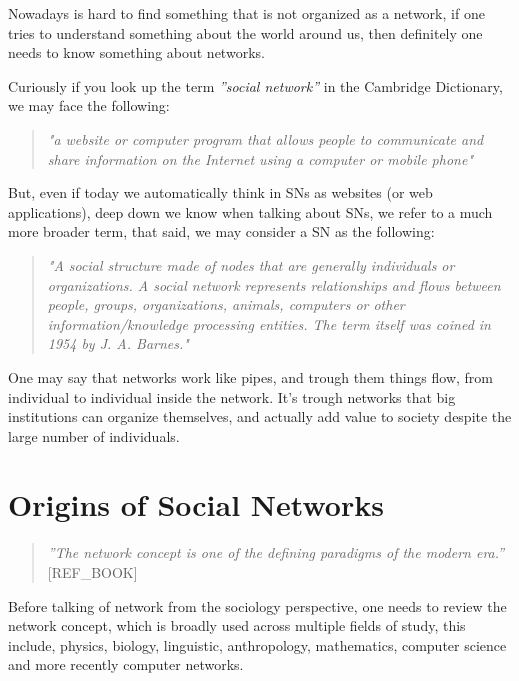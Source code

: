 
\indent \indent Nowadays is hard to find something that is not organized as a network, if one tries to understand something about the world around us, then definitely one needs to know something about networks.

Curiously if you look up the term \textit{''social network''} in the Cambridge Dictionary, we may face the following:

\begin{quote}
\textit{"a website or computer program that allows people to communicate and share information on the Internet using a computer or mobile phone"}
\end{quote}

But, even if today we automatically think in SNs as websites (or web applications), deep down we know when talking about SNs, we refer to a much more broader term, that said, we may consider a SN as the following:

\begin{quote}
\textit{"A social structure made of nodes that are generally individuals or organizations. A social network represents relationships and flows between people, groups, organizations, animals, computers or other information/knowledge processing entities. The term itself was coined in 1954 by J. A. Barnes."}
\end{quote}

One may say that networks work like pipes, and trough them things flow, from individual to individual inside the network. It's trough networks that big institutions can organize themselves, and actually add value to society despite the large number of individuals.

\section{Origins of Social Networks}

\begin{quote}
\textit{''The network concept is one of the defining paradigms of the modern era.''} [REF\_BOOK]
\end{quote}

\indent Before talking of network from the sociology perspective, one needs to review the network concept, which is broadly used across multiple fields of study, this include, physics, biology, linguistic, anthropology, mathematics, computer science and more recently computer networks.

